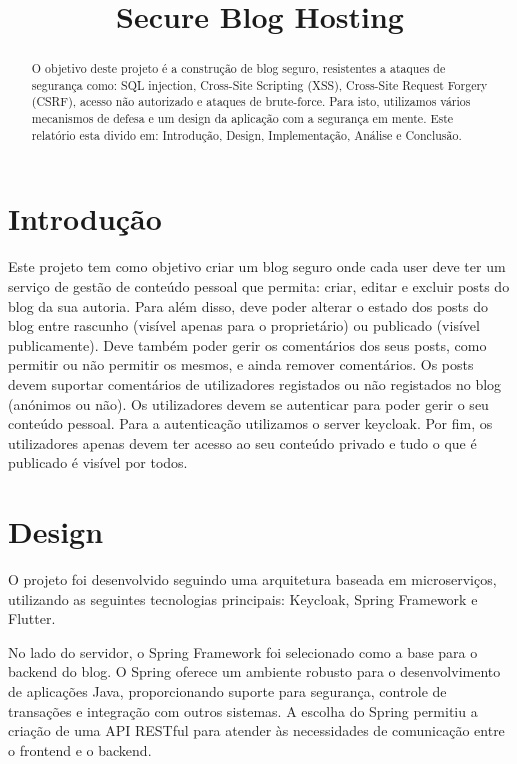 \documentclass[conference]{IEEEtran}
\begin{document}
\title{Secure Blog Hosting}

\author{
\and
{}
\and
{} 
}

\maketitle
\begin{abstract}
O objetivo deste projeto é a construção de blog seguro, resistentes a ataques de segurança como: SQL injection, Cross-Site Scripting (XSS), Cross-Site Request Forgery (CSRF), acesso não autorizado e ataques de brute-force. Para isto, utilizamos vários mecanismos de defesa e um design da aplicação com a segurança em mente. Este relatório esta divido em: Introdução, Design, Implementação, Análise e Conclusão.
\end{abstract}





\section{Introdução}
Este projeto tem como objetivo criar um blog seguro onde cada user deve ter um serviço de gestão de conteúdo pessoal que permita: criar, editar e excluir posts do blog da sua autoria. Para além disso, deve poder alterar o estado dos posts do blog entre rascunho (visível apenas para o proprietário) ou publicado (visível publicamente). Deve também poder gerir os comentários dos seus posts, como permitir ou não permitir os mesmos, e ainda remover comentários. Os posts devem suportar comentários de utilizadores registados ou não registados no blog (anónimos ou não).
Os utilizadores devem se autenticar para poder gerir o seu conteúdo pessoal. Para a autenticação utilizamos o server keycloak.
Por fim, os utilizadores apenas devem ter acesso ao seu conteúdo privado e tudo o que é publicado é visível por todos.


\section{Design}
O projeto foi desenvolvido seguindo uma arquitetura baseada em microserviços, utilizando as seguintes tecnologias principais: Keycloak, Spring Framework e Flutter.

No lado do servidor, o Spring Framework foi selecionado como a base para o backend do blog. O Spring oferece um ambiente robusto para o desenvolvimento de aplicações Java, proporcionando suporte para segurança, controle de transações e integração com outros sistemas. A escolha do Spring permitiu a criação de uma API RESTful para atender às necessidades de comunicação entre o frontend e o backend.
\end{document}
